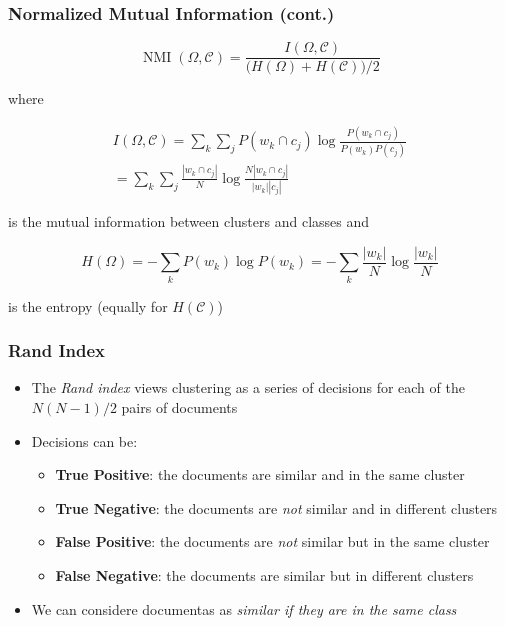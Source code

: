 \documentclass[svgnames]{beamer}
\begin{document}
\begin{frame}
    \frametitle{Normalized Mutual Information (cont.)}

    \begin{block}{}
        \begin{displaymath}
        \operatorname{NMI}(\Omega,\mathcal{C}) =
            \frac{I(\Omega,\mathcal{C})}{\big(H(\Omega)+H(\mathcal{C})\big)/2}
        \end{displaymath}
    \end{block}
    \footnotesize
    where
    \begin{block}{}
        \begin{multline*}
            I(\Omega,\mathcal{C}) = \sum_k\sum_jP(w_k \cap c_j)\log\frac{P(w_k \cap c_j)}{P(w_k)P(c_j)} \\
            = \sum_k\sum_j \frac{|w_k \cap c_j|}{N} \log\frac{N |w_k \cap c_j|}{|w_k||c_j|}
        \end{multline*}
    \end{block}
    is the mutual information between clusters and classes and
    \begin{block}{}
        \begin{displaymath}
            H(\Omega) = -\sum_k P(w_k)\log{P(w_k)} = -\sum_k\frac{|w_k|}{N}\log\frac{|w_k|}{N}
        \end{displaymath}
    \end{block}
    is the entropy (equally for $H(\mathcal{C})$)
\end{frame}

\begin{frame}
    \frametitle{Rand Index}
    \begin{itemize}
    \item The \emph{Rand index} views clustering as a series of decisions for
        each of the $N(N-1)/2$ pairs of documents
    \item Decisions can be:
        \begin{itemize}
        \item \textbf{True Positive}: the documents are similar and in the same cluster
        \item \textbf{True Negative}: the documents are \textit{not} similar and in different clusters
        \item \textbf{False Positive}: the documents are \textit{not} similar but in the same cluster
        \item \textbf{False Negative}: the documents are similar but in different clusters
        \end{itemize}
    \item We can considere documentas as \emph{similar if they are in the same class}
    \end{itemize}
\end{frame}
\end{document}
